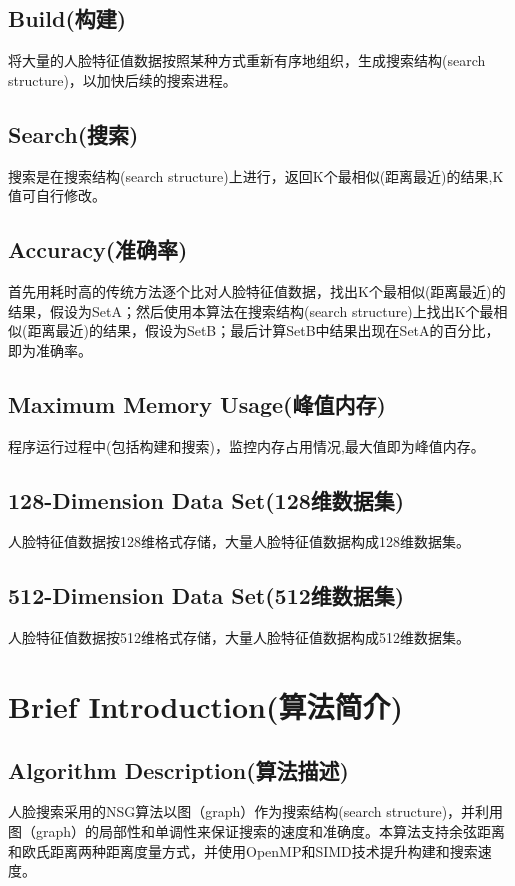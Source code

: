 \documentclass[a4paper, 11pt, UTF8]{ctexart}%
\begin{document}
\subsection{Build(构建)}
将大量的人脸特征值数据按照某种方式重新有序地组织，生成搜索结构(search structure)，以加快后续的搜索进程。
\subsection{Search(搜索)}
搜索是在搜索结构(search structure)上进行，返回K个最相似(距离最近)的结果,K值可自行修改。
\subsection{Accuracy(准确率)}
首先用耗时高的传统方法逐个比对人脸特征值数据，找出K个最相似(距离最近)的结果，假设为SetA；然后使用本算法在搜索结构(search structure)上找出K个最相似(距离最近)的结果，假设为SetB；最后计算SetB中结果出现在SetA的百分比，即为准确率。
\subsection{Maximum Memory Usage(峰值内存)}
程序运行过程中(包括构建和搜索)，监控内存占用情况,最大值即为峰值内存。
\subsection{128-Dimension Data Set(128维数据集)}
人脸特征值数据按128维格式存储，大量人脸特征值数据构成128维数据集。
\subsection{512-Dimension Data Set(512维数据集)}
人脸特征值数据按512维格式存储，大量人脸特征值数据构成512维数据集。
\section{Brief Introduction(算法简介)}
\subsection{Algorithm Description(算法描述)}
人脸搜索采用的NSG算法以图（graph）作为搜索结构(search structure)，并利用图（graph）的局部性和单调性来保证搜索的速度和准确度。本算法支持余弦距离和欧氏距离两种距离度量方式，并使用OpenMP和SIMD技术提升构建和搜索速度。
\end{document}
